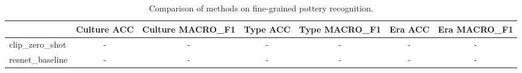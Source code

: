 \begin{table}[t]
\centering
\caption{Comparison of methods on fine-grained pottery recognition.}
\label{tab:main_results}
\small
\begin{tabular}{lcccccc}
\toprule
 & \multicolumn{1}{c}{Culture ACC} & \multicolumn{1}{c}{Culture MACRO_F1} & \multicolumn{1}{c}{Type ACC} & \multicolumn{1}{c}{Type MACRO_F1} & \multicolumn{1}{c}{Era ACC} & \multicolumn{1}{c}{Era MACRO_F1} \\
\midrule
  clip\_zero\_shot & - & - & - & - & - & - \\
  resnet\_baseline & - & - & - & - & - & - \\
\bottomrule
\end{tabular}
\end{table}